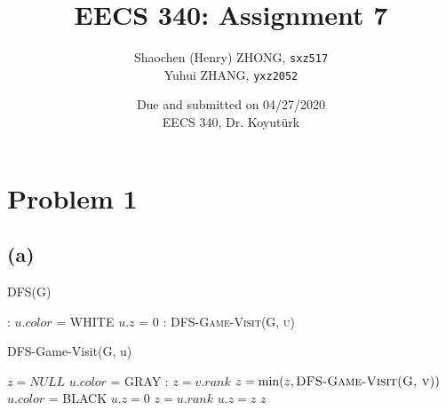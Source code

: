\documentclass[11pt]{article}
\newcommand{\ilc}{\texttt}
\begin{document}
\title{\textbf{EECS 340: Assignment 7}}

\author{Shaochen (Henry) ZHONG, \ilc{sxz517} \\ Yuhui ZHANG, \ilc{yxz2052}}
\date{Due and submitted on 04/27/2020 \\ EECS 340, Dr. Koyut{\"u}rk}
\maketitle

\section{Problem 1}

\subsection{(a)}

\begin{algorithm}[H]
\caption{DFS(G)}
    \begin{algorithmic}[1]
        :
            \State $u.color$ = WHITE
            \State $u.z$ = 0
        \EndFor
        :
                \State \textsc{DFS-Game-Visit(G, u)}
            \EndIf
        \EndFor
    \end{algorithmic}
\end{algorithm}

\begin{algorithm}[H]
\caption{DFS-Game-Visit(G, u)}
    \begin{algorithmic}[1]
        \State $z = NULL$
        \State $u.color$ = GRAY
        :
                \State $z = v.rank$
                \State $z = \min(z, \textsc{DFS-Game-Visit(G, v)})$
            \EndIf
        \EndFor
        \State $u.color$ = BLACK
            \State $u.z = 0$
            \State $z = u.rank$
        \Else
            \State $u.z = z$
        \EndIf
        \State \Return $z$
    \end{algorithmic}
\end{algorithm}

\end{document}
